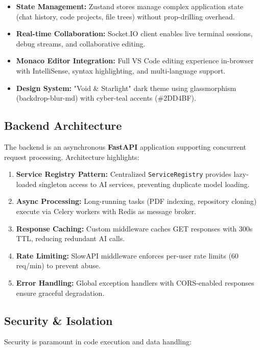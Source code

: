 \documentclass[conference]{IEEEtran}
\begin{document}
\begin{itemize}
    \item \textbf{State Management:} Zustand stores manage complex application state (chat history, code projects, file trees) without prop-drilling overhead.
    \item \textbf{Real-time Collaboration:} Socket.IO client enables live terminal sessions, debug streams, and collaborative editing.
    \item \textbf{Monaco Editor Integration:} Full VS Code editing experience in-browser with IntelliSense, syntax highlighting, and multi-language support.
    \item \textbf{Design System:} "Void \& Starlight" dark theme using glassmorphism (backdrop-blur-md) with cyber-teal accents (\#2DD4BF).
\end{itemize}

\subsection{Backend Architecture}

The backend is an asynchronous \textbf{FastAPI} application supporting concurrent request processing. Architecture highlights:

\begin{enumerate}
    \item \textbf{Service Registry Pattern:} Centralized \texttt{ServiceRegistry} provides lazy-loaded singleton access to AI services, preventing duplicate model loading.
    \item \textbf{Async Processing:} Long-running tasks (PDF indexing, repository cloning) execute via Celery workers with Redis as message broker.
    \item \textbf{Response Caching:} Custom middleware caches GET responses with 300s TTL, reducing redundant AI calls.
    \item \textbf{Rate Limiting:} SlowAPI middleware enforces per-user rate limits (60 req/min) to prevent abuse.
    \item \textbf{Error Handling:} Global exception handlers with CORS-enabled responses ensure graceful degradation.
\end{enumerate}

\subsection{Security \& Isolation}

Security is paramount in code execution and data handling:
\end{document}
